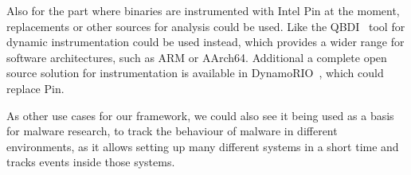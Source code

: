 Also for the part where binaries are instrumented with Intel Pin at the moment,
replacements or other sources for analysis could be used. Like the
QBDI~\cite{qbdi} tool for dynamic instrumentation could be used instead, which
provides a wider range for software architectures, such as ARM or AArch64.
Additional a complete open source solution for instrumentation is available in
DynamoRIO~\cite{dynrio}, which could replace Pin.

As other use cases for our framework, we could also see it being used as a basis
for malware research, to track the behaviour of malware in different
environments, as it allows setting up many different systems in a short time and
tracks events inside those systems.

